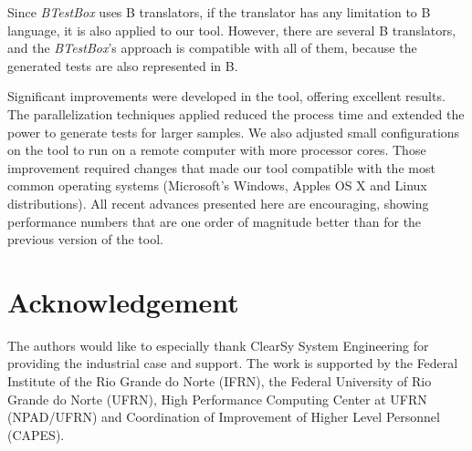 \documentclass[runningheads]{llncs}
\begin{document}


Since  \textit{BTestBox} uses B translators, if the translator has any limitation to B language, it is also applied to our tool. However, there are several B translators, and the  \textit{BTestBox}'s approach is compatible with all of them, because the generated tests are also represented in B. 

Significant improvements were developed in the tool, offering excellent results.
The parallelization techniques applied reduced the process time and extended the power to generate tests for larger samples. We also adjusted small configurations on the tool to run on a remote computer with more processor cores. Those improvement required changes that made our tool compatible with the most common operating systems (Microsoft’s Windows, Apple\textquotesingle s OS X and Linux distributions). All recent advances presented here are encouraging, showing performance numbers that are one order of magnitude better than for the previous version of the tool.


\section*{Acknowledgement}
  The authors would like to especially thank ClearSy System Engineering for providing the industrial case and support. %
  The work is supported by the Federal Institute of the Rio Grande do Norte (IFRN), the Federal University of Rio Grande do Norte (UFRN), High Performance Computing Center at UFRN (NPAD/UFRN) and Coordination of Improvement of Higher Level Personnel (CAPES).



%
%
%




 
\end{document}
